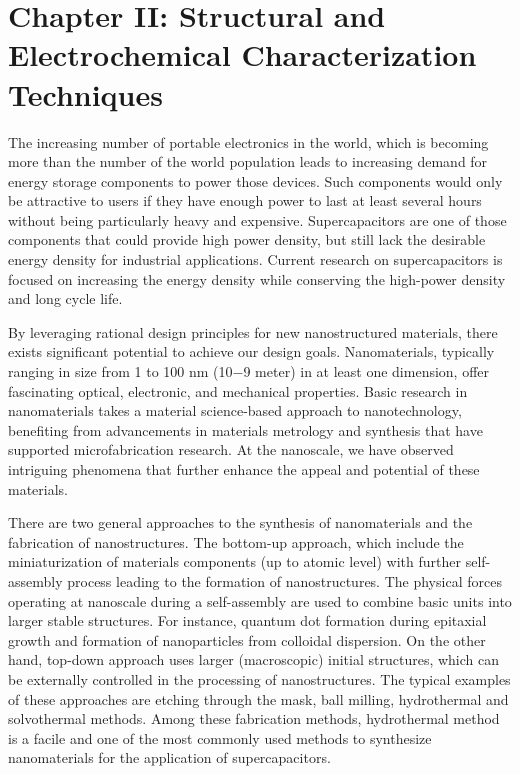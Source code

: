 \documentclass[reprint,amsmath,amssymb,aps,floatfix,
]{revtex4-2}
\begin{document}
\section*{\label{sec:level1}C\lowercase{hapter} II: S\lowercase{tructural and} E\lowercase{lectrochemical} C\lowercase{haracterization} T\lowercase{echniques}}
The increasing number of portable electronics in the world, which is becoming more than the number of the world population leads to increasing demand for energy storage components to power those devices. Such components would only be attractive to users if they have enough power to last at least several hours without being particularly heavy and expensive. Supercapacitors are one of those components that could provide high power density, but still lack the desirable energy density for industrial applications. Current research on supercapacitors is focused on increasing the energy density while conserving the high-power density and long cycle life.

By leveraging rational design principles for new nanostructured materials, there exists significant potential to achieve our design goals. Nanomaterials, typically ranging in size from 1 to 100 nm (10$-$9 meter) in at least one dimension, offer fascinating optical, electronic, and mechanical properties. Basic research in nanomaterials takes a material science-based approach to nanotechnology, benefiting from advancements in materials metrology and synthesis that have supported microfabrication research. At the nanoscale, we have observed intriguing phenomena that further enhance the appeal and potential of these materials.

There are two general approaches to the synthesis of nanomaterials and the fabrication of nanostructures. The bottom-up approach, which include the miniaturization of materials components (up to atomic level) with further self-assembly process leading to the formation of nanostructures. The physical forces operating at nanoscale during a self-assembly are used to combine basic units into larger stable structures. For instance, quantum dot formation during epitaxial growth and formation of nanoparticles from colloidal dispersion. On the other hand, top-down approach uses larger (macroscopic) initial structures, which can be externally controlled in the processing of nanostructures. The typical examples of these approaches are etching through the mask, ball milling, hydrothermal and solvothermal methods. Among these fabrication methods, hydrothermal method is a facile and one of the most commonly used methods to synthesize nanomaterials for the application of supercapacitors.
\end{document}
